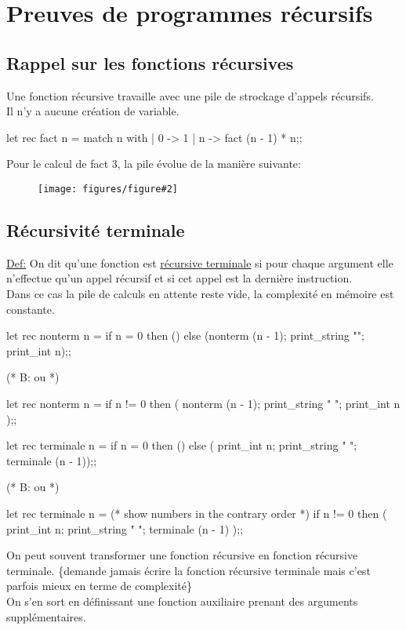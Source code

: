 \documentclass{article}
\newcommand{\schem}[3]
{
	\begin{figure}[ht]
		\centering
		\textbf{#1}\par\medskip
		\texttt{[image: figures/figure\#2]}
		\caption{}
	\end{figure}
}
\begin{document}
\section{Preuves de programmes récursifs}

	\subsection{Rappel sur les fonctions récursives}
	
		Une fonction récursive travaille avec une pile de strockage d'appels récursifs.\\
		Il n'y a aucune création de variable.
		
		\begin{case}
let rec fact n = match n with
| 0 -> 1
| n -> fact (n - 1) * n;;
		\end{case}
		
		Pour le calcul de fact 3, la pile évolue de la manière suivante:
		 
		\schem{}{3}{0.5}
		
		\subsection{Récursivité terminale}
		
		\underline{Def:} On dit qu'une fonction est \underline{récursive terminale} si pour chaque argument elle n'effectue qu'un appel récursif et si cet appel est la dernière instruction.\\
		Dans ce cas la pile de calculs en attente reste vide, la complexité en mémoire est constante.\\
		
		\begin{case}
let rec nonterm n =
	if n = 0 then ()
	else (nonterm (n - 1);
		print_string "";
		print_int n);;
		
(* B: ou *)

let rec nonterm n =
	if n != 0 then
	(
		nonterm (n - 1);
		print_string " ";
		print_int n
	);;
	
let rec terminale n =
	if n = 0 then ()
	else ( print_int n; print_string " ";
		terminale (n - 1));;

(* B: ou *)

let rec terminale n = (* show numbers in the contrary order *)
	if n != 0 then
	(
		print_int n;
		print_string " ";
		terminale (n - 1)
	);;
		\end{case}
	
	On peut souvent transformer une fonction récursive en fonction récursive terminale. \{demande jamais écrire la fonction récursive terminale mais c'est parfois mieux en terme de complexité\}\\
	On s'en sort en définissant une fonction auxiliaire prenant des arguments supplémentaires.
	
\end{document}
